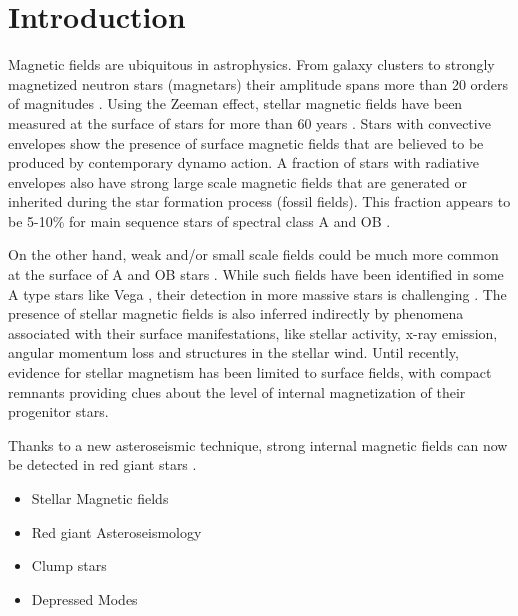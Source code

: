 \section{Introduction}
\label{intro}
Magnetic fields are ubiquitous in astrophysics. From  galaxy clusters to strongly magnetized neutron stars (magnetars) their amplitude spans more than 20 orders of magnitudes \citep{Brandenburg_2005}. Using the Zeeman effect, stellar magnetic fields have been measured at the surface of stars
for more than 60 years \citep{Babcock_1947,Landstreet_1992,Donati_2009}. Stars with convective envelopes show the presence of surface magnetic fields that are believed to be produced by contemporary dynamo action. A fraction of stars with radiative envelopes also have strong large scale magnetic fields that are generated or inherited during the star formation process (fossil fields). This fraction appears to be 5-10\% for main sequence stars of spectral class A \citep[e.g.,][]{Auri_re_2004} and OB \citep{2012ASPC..464..405W}.

On the other hand, weak and/or small scale fields could be much more common at the surface of A and OB stars \citep{Cantiello_2011}. While such fields have been identified in some A type stars like Vega \cite{Ligni_res_2009}, their detection in more massive stars is challenging \cite{2013A&A...554A..93K}. The presence of stellar magnetic fields is also inferred indirectly by phenomena associated with their surface manifestations, like stellar activity, x-ray emission, angular momentum loss and structures in the stellar wind. Until recently, evidence for stellar magnetism has been limited to surface fields, with compact remnants providing clues about the level of internal magnetization of their progenitor stars.

Thanks to a new asteroseismic technique, strong internal magnetic fields can now be detected in red giant stars \cite{Fuller_2015}. 
\begin{itemize}
\item Stellar Magnetic fields
\item Red giant Asteroseismology
\item Clump stars
\item Depressed Modes
\end{itemize}


  